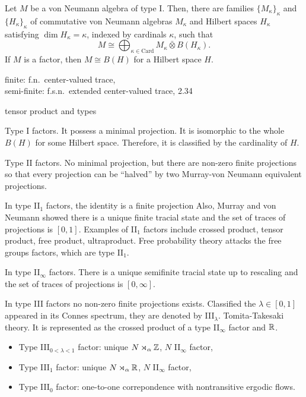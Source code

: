 \documentclass{../../large}
\begin{document}
\begin{prb}[Type I]
Let $M$ be a von Neumann algebra of type I.
Then, there are families $\{M_\kappa\}_\kappa$ and $\{H_\kappa\}_\kappa$ of commutative von Neumann algebras $M_\kappa$ and Hilbert spaces $H_\kappa$ satisfying $\dim H_\kappa=\kappa$, indexed by cardinals $\kappa$, such that
\[M\cong\bigoplus_{\kappa\in\mathrm{Card}}M_\kappa\bar\otimes B(H_\kappa).\]
If $M$ is a factor, then $M\cong B(H)$ for a Hilbert space $H$.
\end{prb}




finite: f.n.~center-valued trace, \\
semi-finite: f.s.n.~extended center-valued trace, 2.34

tensor product and types





Type I factors.
It possess a minimal projection.
It is isomorphic to the whole $B(H)$ for some Hilbert space.
Therefore, it is classified by the cardinality of $H$.

Type II factors.
No minimal projection, but there are non-zero finite projections so that every projection can be ``halved'' by two Murray-von Neumann equivalent projections.

In type II$_1$ factors, the identity is a finite projection
Also, Murray and von Neumann showed there is a unique finite tracial state and the set of traces of projections is $[0,1]$.
Examples of II$_1$ factors include crossed product, tensor product, free product, ultraproduct.
Free probability theory attacks the free groups factors, which are type II$_1$.

In type II$_\infty$ factors.
There is a unique semifinite tracial state up to rescaling and the set of traces of projections is $[0,\infty]$.

In type III factors no non-zero finite projections exists.
Classified the $\lambda\in[0,1]$ appeared in its Connes spectrum, they are denoted by III$_\lambda$.
Tomita-Takesaki theory.
It is represented as the crossed product of a type II$_\infty$ factor and $\mathbb{R}$.

\begin{itemize}
\item Type III$_{0<\lambda<1}$ factor: unique $N\rtimes_\alpha\mathbb{Z}$, $N$ II$_\infty$ factor,
\item Type III$_1$ factor: unique $N\rtimes_\alpha\mathbb{R}$, $N$ II$_\infty$ factor,
\item Type III$_0$ factor: one-to-one correpondence with nontransitive ergodic flows.
\end{itemize}
\end{document}

